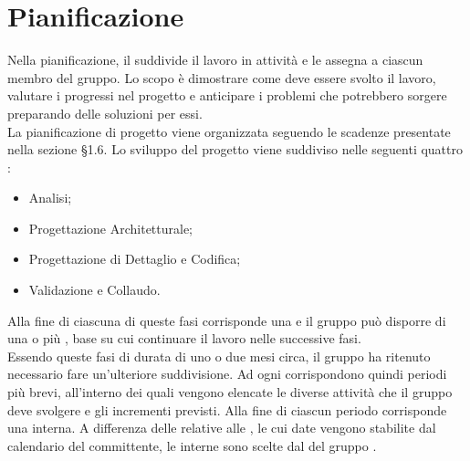 \section{Pianificazione}
Nella pianificazione, il \Responsabile{} suddivide il lavoro in attività e le assegna a ciascun membro del gruppo.
Lo scopo è dimostrare come deve essere svolto il lavoro, valutare i progressi nel progetto e anticipare i problemi che potrebbero sorgere preparando delle soluzioni per essi.\\
La pianificazione di progetto viene organizzata seguendo le scadenze presentate nella sezione §1.6.
Lo sviluppo del progetto viene suddiviso nelle seguenti quattro : 
\begin{itemize}
	\item Analisi;
	\item Progettazione Architetturale;
	\item Progettazione di Dettaglio e Codifica;
	\item Validazione e Collaudo.
\end{itemize}
Alla fine di ciascuna di queste fasi corrisponde una  e il gruppo può disporre di una o più , base su cui continuare il lavoro nelle successive fasi.\\
Essendo queste fasi di durata di uno o due mesi circa, il gruppo ha ritenuto necessario fare un'ulteriore suddivisione. Ad ogni  corrispondono quindi periodi più brevi, all'interno dei quali vengono elencate le diverse attività che il gruppo \Gruppo{} deve svolgere e gli incrementi previsti.
Alla fine di ciascun periodo corrisponde una  interna. A differenza delle  relative alle , le cui date vengono stabilite dal calendario del committente, le  interne sono scelte dal \Responsabile{} del gruppo \Gruppo{}.







